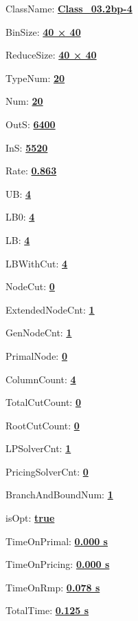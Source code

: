 \documentclass[11pt]{article}
\begin{document}
\pagestyle{empty}


ClassName: \underline{\textbf{Class_03.2bp-4}}
\par
BinSize: \underline{\textbf{40 × 40}}
\par
ReduceSize: \underline{\textbf{40 × 40}}
\par
TypeNum: \underline{\textbf{20}}
\par
Num: \underline{\textbf{20}}
\par
OutS: \underline{\textbf{6400}}
\par
InS: \underline{\textbf{5520}}
\par
Rate: \underline{\textbf{0.863}}
\par
UB: \underline{\textbf{4}}
\par
LB0: \underline{\textbf{4}}
\par
LB: \underline{\textbf{4}}
\par
LBWithCut: \underline{\textbf{4}}
\par
NodeCut: \underline{\textbf{0}}
\par
ExtendedNodeCnt: \underline{\textbf{1}}
\par
GenNodeCnt: \underline{\textbf{1}}
\par
PrimalNode: \underline{\textbf{0}}
\par
ColumnCount: \underline{\textbf{4}}
\par
TotalCutCount: \underline{\textbf{0}}
\par
RootCutCount: \underline{\textbf{0}}
\par
LPSolverCnt: \underline{\textbf{1}}
\par
PricingSolverCnt: \underline{\textbf{0}}
\par
BranchAndBoundNum: \underline{\textbf{1}}
\par
isOpt: \underline{\textbf{true}}
\par
TimeOnPrimal: \underline{\textbf{0.000 s}}
\par
TimeOnPricing: \underline{\textbf{0.000 s}}
\par
TimeOnRmp: \underline{\textbf{0.078 s}}
\par
TotalTime: \underline{\textbf{0.125 s}}
\par
\newpage


\end{document}
